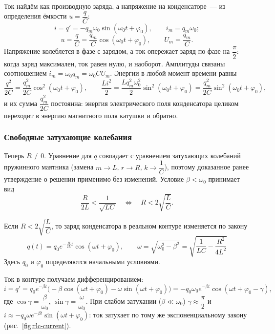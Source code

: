 \documentclass[12pt]{article}
\begin{document}
	Ток найдём как производную заряда, а напряжение на конденсаторе~--- из определения ёмкости $u = \dfrac{q}{C}$:
	\[
		i = q' = -q_m \omega_0 \sin (\omega_0 t + \varphi_0), \qquad i_m = q_m \omega_0;
	\]
	\[
		u = \dfrac{q}{C} = \dfrac{q_m}{C} \cos (\omega_0 t + \varphi_0), \qquad U_m = \dfrac{q_m}{C}.
	\]
	Напряжение колеблется в фазе с зарядом, а ток опережает заряд по фазе на $\dfrac{\pi}{2}$: когда заряд максимален, ток равен нулю, и наоборот. Амплитуды связаны соотношением $i_m = \omega_0 q_m = \omega_0 C U_m$. Энергии в любой момент времени равны
	\[
		\dfrac{q^2}{2C} = \dfrac{q_m^2}{2C} \cos^2 (\omega_0 t + \varphi_0), \qquad \dfrac{Li^2}{2} = \dfrac{L q_m^2 \omega_0^2}{2} \sin^2 (\omega_0 t + \varphi_0) = \dfrac{q_m^2}{2C} \sin^2 (\omega_0 t + \varphi_0),
	\]
	и их сумма $\dfrac{q_m^2}{2C}$ постоянна: энергия электрического поля конденсатора целиком переходит в энергию магнитного поля катушки и обратно.
	
	\subsubsection{Свободные затухающие колебания}
	
	Теперь $R \ne 0$. Уравнение для $q$ совпадает с уравнением затухающих колебаний пружинного маятника (замена $m \to L$, $r \to R$, $k \to \dfrac{1}{C}$), поэтому доказанное ранее утверждение о решении применимо без изменений. Условие $\beta < \omega_0$ принимает вид
	\[
		\dfrac{R}{2L} < \dfrac{1}{\sqrt{LC}} \quad \Longleftrightarrow \quad R < 2\sqrt{\dfrac{L}{C}}.
	\]
	
	\begin{statement}[Итог]
		Если $R < 2\sqrt{\dfrac{L}{C}}$, то заряд конденсатора в реальном контуре изменяется по закону
		\[
			\boxed{q(t) = q_0 e^{-\frac{R}{2L}t} \cos (\omega t + \varphi_0), \qquad \omega = \sqrt{\omega_0^2 - \beta^2} = \sqrt{\dfrac{1}{LC} - \dfrac{R^2}{4L^2}}}
		\]
		Здесь $q_0$ и $\varphi_0$ определяются начальными условиями.
	\end{statement}
	
	Ток в контуре получаем дифференцированием:
	\[
		i = q' = q_0 e^{-\beta t} \bigl( -\beta \cos (\omega t + \varphi_0) - \omega \sin (\omega t + \varphi_0) \bigr) = -q_0 \omega_0 e^{-\beta t} \cos (\omega t + \varphi_0 - \gamma),
	\]
	где $\cos \gamma = \dfrac{\beta}{\omega_0}$, $\sin \gamma = \dfrac{\omega}{\omega_0}$. При слабом затухании ($\beta \ll \omega_0$) $\gamma \approx \dfrac{\pi}{2}$ и $i \approx -q_0 \omega e^{-\beta t} \sin (\omega t + \varphi_0)$: ток затухает по тому же экспоненциальному закону (рис.~\ref{fig:rlc-current}).
	
\end{document}
